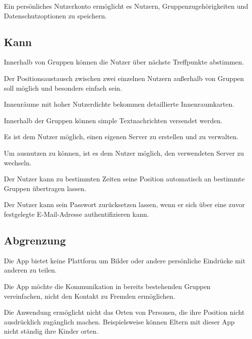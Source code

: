 \documentclass[parskip=full,11pt]{scrartcl}
\begin{document}
Ein persönliches Nutzerkonto ermöglicht es Nutzern,
Gruppenzugehörigkeiten und Datenschutzoptionen zu speichern.

\subsection{Kann}
Innerhalb von Gruppen können die Nutzer über nächste Treffpunkte abstimmen.

Der Positionsaustausch zwischen zwei einzelnen Nutzern außerhalb von Gruppen
soll möglich und besonders einfach sein.

Innenräume mit hoher Nutzerdichte bekommen detaillierte Innenraumkarten.

Innerhalb der Gruppen können simple Textnachrichten versendet werden.

Es ist dem Nutzer möglich, einen eigenen Server zu erstellen und zu verwalten.

Um  ausnutzen zu können, ist es dem Nutzer
möglich, den verwendeten Server zu wechseln.

Der Nutzer kann zu bestimmten Zeiten seine Position automatisch an bestimmte
Gruppen übertragen lassen.

Der Nutzer kann sein Passwort zurücksetzen lassen, wenn er sich über eine zuvor
festgelegte E-Mail-Adresse authentifizieren kann.

\subsection{Abgrenzung}
Die App bietet keine Plattform um Bilder oder andere persönliche Eindrücke mit
anderen zu teilen.

Die App möchte die Kommunikation in bereits bestehenden Gruppen vereinfachen,
nicht den Kontakt zu Fremden ermöglichen.

Die Anwendung ermöglicht nicht das Orten von Personen,
die ihre Position nicht ausdrücklich zugänglich machen.
Beispielsweise können Eltern mit dieser App nicht ständig ihre Kinder orten.
\end{document}

